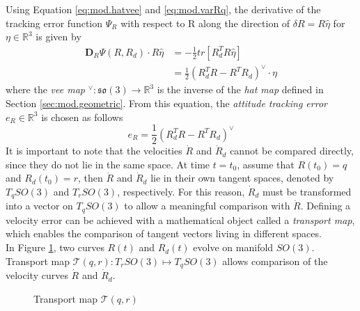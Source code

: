Using Equation \ref{eq:mod.hatvee} and \ref{eq:mod.varRq}, the derivative of the tracking error function $ \Psi_R $ with respect to R along the direction of $ \delta R=R\hat{\eta} $ for $ \eta\in\mathbb{R}^3 $ is given by
\begin{equation}\label{key}
\begin{aligned}
\mathbf{D}_R\Psi(R,R_d)\cdot R\hat{\eta}&=-\frac{1}{2}tr[R_d^TR\hat{\eta}]\\
&=\frac{1}{2}(R^T_dR-R^TR_d)^\vee\cdot\eta
\end{aligned}
\end{equation}
where the \textit{vee map} $ ^\vee:\mathfrak{so}(3)\rightarrow\mathbb{R}^3 $ is the inverse of the \textit{hat map} defined in Section \ref{sec:mod.geometric}. From this equation, the  \textit{attitude tracking error} $ e_R \in \mathbb{R}^3$ is chosen as follows
\begin{equation}\label{eq:con.eR}
e_R=\frac{1}{2}(R_d^TR-R^TR_d)^\vee
\end{equation}
It is important to note that the velocities $ \dot{R} $ and $ \dot{R}_d $ cannot be compared directly, since they do not lie in the same space. 
At time $ t=t_0 $, assume that $ R(t_0)=q$ and $R_d(t_0)=r$, then $ \dot{R} $ and $ \dot{R}_d $ lie in their own tangent spaces, denoted by $ T_qSO(3)$ and $ T_{r}SO(3)$, respectively. For this reason, $ \dot{R}_d $ must be transformed into a vector on $ T_qSO(3) $ to allow a meaningful comparison with $ \dot{R} $. 
Defining a velocity error can be achieved with a mathematical object called a \textit{transport map}, 
which enables the comparison of tangent vectors living in different spaces.\\ 
In Figure \ref{fig:con.transport}, two curves $ R(t) $ and $R_d(t)$ evolve on manifold $ SO(3) $. 
Transport map $ \mathcal{T}(q,r):T_{r}SO(3)\mapsto T_qSO(3) $ allows comparison of the velocity curves $ \dot{R} $ and $ \dot{R}_d $.
\begin{figure}[h!]
	\centering
	\caption{Transport map $ \mathcal{T}(q,r) $\label{fig:con.transport}}
\end{figure}		
